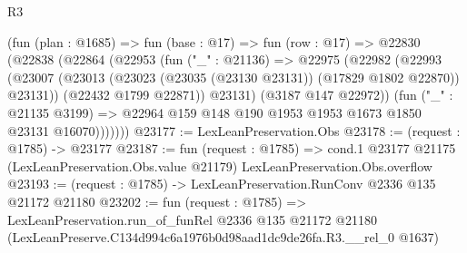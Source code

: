\begin{lexlean}{R3}
\begin{coremodule}
        (fun (plan : @1685) =>
        fun (base : @17) =>
        fun (row : @17) =>
        @22830
          (@22838
            (@22864
              (@22953
                (fun ("_" : @21136) =>
                @22975
                  (@22982
                    (@22993
                      (@23007
                        (@23013 (@23023 (@23035 (@23130 @23131)) (@17829 @1802 @22870)) @23131))
                      (@22432 @1799 @22871))
                    @23131)
                  (@3187 @147 @22972))
                (fun ("_" : @21135 @3199) =>
                @22964 @159 @148 @190 @1953 @1953 @1673 @1850 @23131 @16070)))))))
@23177 := LexLeanPreservation.Obs
@23178 := (request : @1785) -> @23177
@23187 := fun (request : @1785) =>
  cond.{1} @23177 @21175 (LexLeanPreservation.Obs.value @21179) LexLeanPreservation.Obs.overflow
@23193 := (request : @1785) -> LexLeanPreservation.RunConv @2336 @135 @21172 @21180
@23202 := fun (request : @1785) =>
  LexLeanPreservation.run_of_funRel
    @2336
    @135
    @21172
    @21180
    (LexLeanPreserve.C134d994c6a1976b0d98aad1dc9de26fa.R3.__rel_0 @1637)
\end{coremodule}
\end{lexlean}
